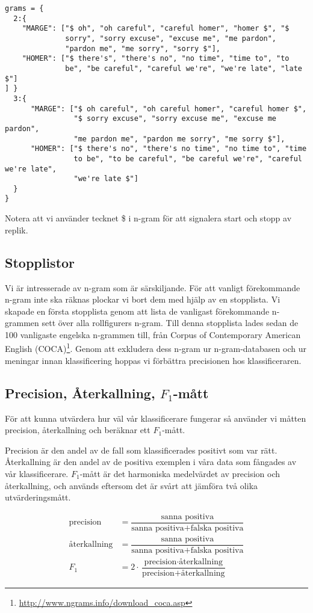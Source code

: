 \documentclass[a5paper]{article}
\begin{document}
\begin{verbatim}
grams = {
  2:{
    "MARGE": ["$ oh", "oh careful", "careful homer", "homer $", "$
              sorry", "sorry excuse", "excuse me", "me pardon",
              "pardon me", "me sorry", "sorry $"],
    "HOMER": ["$ there's", "there's no", "no time", "time to", "to
              be", "be careful", "careful we're", "we're late", "late $"]
] }
  3:{
      "MARGE": ["$ oh careful", "oh careful homer", "careful homer $",
                "$ sorry excuse", "sorry excuse me", "excuse me pardon",
                "me pardon me", "pardon me sorry", "me sorry $"],
      "HOMER": ["$ there's no", "there's no time", "no time to", "time
                to be", "to be careful", "be careful we're", "careful we're late",
                "we're late $"]
  }
}
\end{verbatim}
Notera att vi använder tecknet \$ i n-gram för att signalera start och
stopp av replik.

\subsection{Stopplistor}
Vi är intresserade av n-gram som är särskiljande. För att vanligt förekommande
n-gram inte ska räknas plockar vi bort dem med hjälp av en stopplista. Vi
skapade en första stopplista genom att lista de vanligast förekommande n-grammen
sett över alla rollfigurers n-gram. Till denna stopplista lades sedan de 100
vanligaste engelska n-grammen till, från Corpus of Contemporary American English
(COCA)\footnote{\url{http://www.ngrams.info/download_coca.asp}}. Genom att
exkludera dess n-gram ur n-gram-databasen och ur meningar innan klassificering
hoppas vi förbättra precisionen hos klassificeraren.


\subsection{Precision, Återkallning, $F_1$-mått}
För att kunna utvärdera hur väl vår klassificerare fungerar så använder vi
måtten precision, återkallning och beräknar ett $F_1$-mått.

Precision är den andel av de fall som klassificerades positivt som var rätt.
Återkallning är den andel av de positiva exemplen i våra data som fångades av
vår klassificerare. $F_1$-mått är det harmoniska medelvärdet av precision och
återkallning, och används eftersom det är svårt att jämföra två olika
utvärderingsmått.

\begin{align*}
\text{precision}&=\dfrac{\text{sanna positiva}}{\text{sanna positiva} + \text{falska positiva}}\\
\text{återkallning}&=\dfrac{\text{sanna positiva}}{\text{sanna positiva} + \text{falska positiva}}\\
F_1 &= 2 \cdot \dfrac{\text{precision} \cdot \text{återkallning}}{\text{precision} + \text{återkallning}}
\end{align*}
\end{document}
